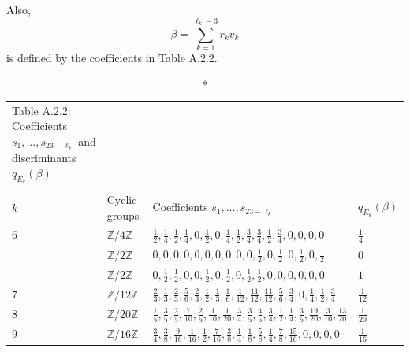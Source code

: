 \documentclass[10pt]{article}
\begin{document}
Also,
$$\beta = \sum_{k=1}^{\ell_k-3} r_k v_k $$
is defined by the coefficients in Table A.2.2.


\begin{longtable}{llll}
\caption*{Table A.2.2: Coefficients  $s_1,\ldots, s_{23-\ell_k}$ and discriminants $q_{E_k}(\beta)$}
\vspace{-5.5mm}\\
\\
\hline
  $k$ &Cyclic groups & Coefficients  $s_1,\ldots, s_{23-\ell_k}$  & $q_{E_k} (\beta)$    \vspace{1mm}
    \\
  \hline
  \endhead
\vspace{1mm}$6$  &$ \mathbb{Z}/4\mathbb{Z}$ & $\frac{1}{2},\frac{1}{4},\frac{1}{2},\frac{1}{4},0,\frac{1}{2},0,\frac{1}{4},\frac{1}{2},\frac{3}{4},\frac{3}{4},\frac{1}{2},\frac{3}{4},0,0,0,0 $   & $\frac{1}{4}$ \vspace{1mm}\\
\vspace{1mm}  &$ \mathbb{Z}/2\mathbb{Z}$&  $0,0,0,0,0,0,0,0,0,0,\frac{1}{2},0,\frac{1}{2},0,\frac{1}{2},0,\frac{1}{2} $   & $0$ \vspace{1mm}\\
\vspace{1mm} &$ \mathbb{Z}/2\mathbb{Z}$ & $0,\frac{1}{2},\frac{1}{2},0,0,\frac{1}{2},0,\frac{1}{2},0,\frac{1}{2},\frac{1}{2},0,0,0,0,0,0  $   & $1$ \vspace{1mm}\\
\vspace{1mm}$7$  &$ \mathbb{Z}/12\mathbb{Z}$ & $\frac{2}{3}, \frac{1}{3}, \frac{2}{3}, \frac{5}{6}, \frac{2}{3}, \frac{1}{2}, \frac{1}{3}, \frac{1}{6}, \frac{1}{12}, \frac{11}{12}, \frac{11}{12}, \frac{5}{6}, \frac{3}{4}, 0, \frac{1}{4}, \frac{1}{2}, \frac{3}{4}$ & $\frac{1}{12}$  \vspace{1mm}\\
\vspace{1mm}$8$ &$ \mathbb{Z}/20\mathbb{Z}$ & $\frac {1} {5}, \frac {3} {5}, \frac {2} {5}, \frac {7} {10}, \frac {2} {5}, \frac {1} {10}, \frac {1} {20}, \frac {3} {4}, \frac {3}{5}, \frac {4} {5}, \frac {3} {4}, \frac {1} {2}, \frac {1} {4},\frac {3} {5}, \frac {19} {20}, \frac {3} {10}, \frac {13} {20}$&  $\frac{1}{20}$ \vspace{1mm}\\
\vspace{1mm}$9$ &$ \mathbb{Z}/16\mathbb{Z}$ & $\frac{3}{4},\frac{3}{8},\frac{9}{16},\frac{1}{16},\frac{1}{2},\frac{7}{16},\frac{3}{8},\frac{1}{4},\frac{1}{8},\frac{5}{8},\frac{1}{4},\frac{7}{8},\frac{15}{16},0,0,0,0$ & $\frac{1}{16}$ \vspace{1mm}\\

\end{longtable}
\end{document}
